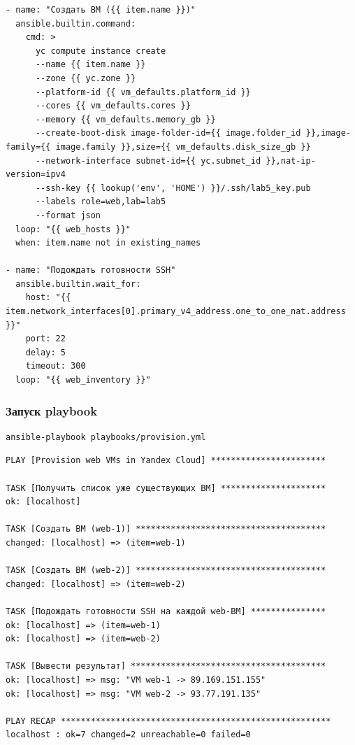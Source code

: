\documentclass[12pt,a4paper]{article}
\begin{document}
\begin{lstlisting}
- name: "Создать ВМ ({{ item.name }})"
  ansible.builtin.command:
    cmd: >
      yc compute instance create
      --name {{ item.name }}
      --zone {{ yc.zone }}
      --platform-id {{ vm_defaults.platform_id }}
      --cores {{ vm_defaults.cores }}
      --memory {{ vm_defaults.memory_gb }}
      --create-boot-disk image-folder-id={{ image.folder_id }},image-family={{ image.family }},size={{ vm_defaults.disk_size_gb }}
      --network-interface subnet-id={{ yc.subnet_id }},nat-ip-version=ipv4
      --ssh-key {{ lookup('env', 'HOME') }}/.ssh/lab5_key.pub
      --labels role=web,lab=lab5
      --format json
  loop: "{{ web_hosts }}"
  when: item.name not in existing_names

- name: "Подождать готовности SSH"
  ansible.builtin.wait_for:
    host: "{{ item.network_interfaces[0].primary_v4_address.one_to_one_nat.address }}"
    port: 22
    delay: 5
    timeout: 300
  loop: "{{ web_inventory }}"
\end{lstlisting}

\subsubsection{Запуск playbook}

\begin{lstlisting}
ansible-playbook playbooks/provision.yml
\end{lstlisting}

\begin{lstlisting}
PLAY [Provision web VMs in Yandex Cloud] ***********************

TASK [Получить список уже существующих ВМ] *********************
ok: [localhost]

TASK [Создать ВМ (web-1)] **************************************
changed: [localhost] => (item=web-1)

TASK [Создать ВМ (web-2)] **************************************
changed: [localhost] => (item=web-2)

TASK [Подождать готовности SSH на каждой web-ВМ] ***************
ok: [localhost] => (item=web-1)
ok: [localhost] => (item=web-2)

TASK [Вывести результат] ***************************************
ok: [localhost] => msg: "VM web-1 -> 89.169.151.155"
ok: [localhost] => msg: "VM web-2 -> 93.77.191.135"

PLAY RECAP ******************************************************
localhost : ok=7 changed=2 unreachable=0 failed=0
\end{lstlisting}
\end{document}
